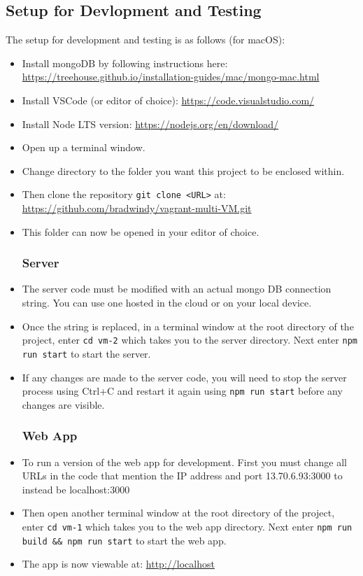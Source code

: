\documentclass[12pt]{extarticle}
\begin{document}
\subsection{Setup for Devlopment and Testing}
The setup for development and testing is as follows (for macOS):
\begin{itemize}
\subsubsection*{Initial Setup}
\item Install mongoDB by following instructions here: \url{https://treehouse.github.io/installation-guides/mac/mongo-mac.html}
\item Install VSCode (or editor of choice): \url{https://code.visualstudio.com/}
\item Install Node LTS version: \url{https://nodejs.org/en/download/}
\item Open up a terminal window.
\item Change directory to the folder you want this project to be enclosed within.
\item Then clone the repository \lstinline|git clone <URL>| at: \url{https://github.com/bradwindy/vagrant-multi-VM.git}
\item This folder can now be opened in your editor of choice.

\subsubsection*{Server}
\item The server code must be modified with an actual mongo DB connection string. You can use one hosted in the cloud or on your local device.
\item Once the string is replaced, in a terminal window at the root directory of the project, enter \lstinline|cd vm-2| which takes you to the server directory. Next enter \lstinline|npm run start| to start the server.
\item If any changes are made to the server code, you will need to stop the server process using Ctrl+C and restart it again using  \lstinline|npm run start| before any changes are visible.

\subsubsection*{Web App}
\item To run a version of the web app for development. First you must change all URLs in the code that mention the IP address and port 13.70.6.93:3000 to instead be localhost:3000
\item Then open another terminal window at the root directory of the project, enter \lstinline|cd vm-1| which takes you to the web app directory. Next enter \lstinline|npm run build && npm run start| to start the web app.
\item The app is now viewable at: \url{http://localhost}

\end{itemize}
\end{document}
